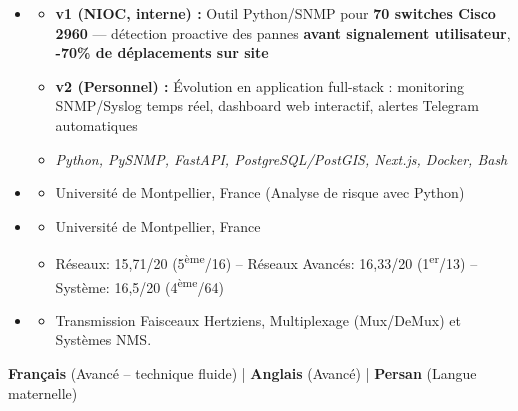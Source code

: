 \documentclass[11pt,a4paper]{article}
\renewcommand{\itemspace}{\vspace{0.15em}}
\begin{document}
\begin{itemize}[leftmargin=1em, label={}]
    \item
    \begin{itemize}[leftmargin=1.5em, label=$\circ$, nosep]
        \item \textbf{v1 (NIOC, interne) :} Outil Python/SNMP pour \textbf{70 switches Cisco 2960} — détection proactive des pannes \textbf{avant signalement utilisateur}, \textbf{-70\% de déplacements sur site}
        \item \textbf{v2 (Personnel) :} Évolution en application full-stack : monitoring SNMP/Syslog temps réel, dashboard web interactif, alertes Telegram automatiques
        \item \emph{Python, PySNMP, FastAPI, PostgreSQL/PostGIS, Next.js, Docker, Bash}
    \end{itemize}
\end{itemize}

\begin{itemize}[leftmargin=1em, label={}]
    \item
    \begin{itemize}[leftmargin=1.5em, label=$\circ$, nosep]
        \item Université de Montpellier, France (Analyse de risque avec Python)
    \end{itemize}
    \itemspace
    \item
    \begin{itemize}[leftmargin=1.5em, label=$\circ$, nosep]
        \item Université de Montpellier, France
        \item Réseaux: 15,71/20 (5\textsuperscript{ème}/16) -- Réseaux Avancés: 16,33/20 (1\textsuperscript{er}/13) -- Système: 16,5/20 (4\textsuperscript{ème}/64)
    \end{itemize}
    \itemspace
    \item
    \begin{itemize}[leftmargin=1.5em, label=$\circ$, nosep]
        \item Transmission Faisceaux Hertziens, Multiplexage (Mux/DeMux) et Systèmes NMS.
    \end{itemize}
\end{itemize}

\noindent
\textbf{Français} (Avancé -- technique fluide) | \textbf{Anglais} (Avancé) | \textbf{Persan} (Langue maternelle)
\end{document}
